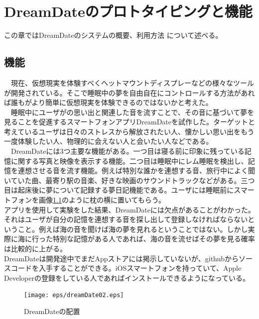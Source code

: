 \chapter{DreamDateのプロトタイピングと機能}
\label{chap:search}

この章ではDreamDateのシステムの概要、利用方法 について述べる。

\section{機能}
　現在、仮想現実を体験すべくヘットマウントディスプレーなどの様々なツールが開発されている。そこで睡眠中の夢を自由自在にコントロールする方法があれば誰もがより簡単に仮想現実を体験できるのではないかと考えた。\\
　睡眠中にユーザがの思い出と関連した音を流すことで、その音に基づいて夢を見ることを促進するスマートフォンアプリDreamDateを試作した。ターゲットと考えているユーザは日々のストレスから解放されたい人、懐かしい思い出をもう一度体験したい人、物理的に会えない人と会いたい人などである。\\
　DreamDateには3つ主要な機能がある。一つ目は寝る前に印象に残っている記憶に関する写真と映像を表示する機能。二つ目は睡眠中にレム睡眠を検出し、記憶を連想させる音を流す機能。例えば特別な誰かを連想する音、旅行中によく聞いていた曲、最寄り駅の音楽、好きな映画のサウンドトラックなどがある。三つ目は起床後に夢について記録する夢日記機能である。ユーザには睡眠前にスマートフォンを画像\ref{DreamDateImage}のように枕の横に置いてもらう。\\
アプリを使用して実験をした結果、DreamDateには欠点があることがわかった。それはユーザが自分の記憶を連想する音を探し出して登録しなければならないということ。例えば海の音を聞けば海の夢を見れるということではない。しかし実際に海に行った特別な記憶がある人であれば、海の音を流せばその夢を見る確率は比較的に上がる。\\
DreamDateは開発途中でまだAppストアには掲示していないが、githubからソースコードを入手することができる。iOSスマートフォンを持っていて、Apple Developerの登録をしている人であればインストールできるようになっている。

\begin{figure}[htbp]
\begin{center}
\texttt{[image: eps/dreamDate02.eps]}
\caption{DreamDateの配置}
\label{DreamDateImage}
\end{center}
\end{figure}

